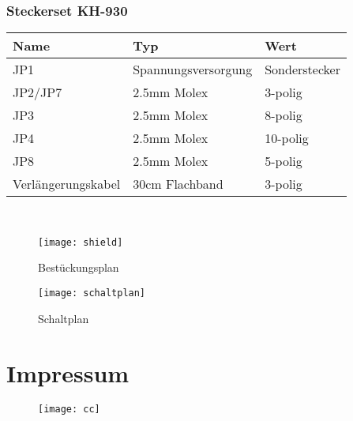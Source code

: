 \documentclass[fleqn,10pt]{SelfArx} %
\begin{document}
\subsubsection*{Steckerset KH-930}

\begin{tabular}{lll}
\hline
\textbf{Name}      & \textbf{Typ}        & \textbf{Wert}  \\ \hline
JP1                & Spannungsversorgung & Sonderstecker  \\ \hline
JP2/JP7            & 2.5mm Molex         & 3-polig        \\ \hline
JP3                & 2.5mm Molex         & 8-polig        \\ \hline
JP4                & 2.5mm Molex         & 10-polig       \\ \hline
JP8                & 2.5mm Molex         & 5-polig        \\ \hline
Verlängerungskabel & 30cm Flachband      & 3-polig        \\ \hline
\end{tabular}\\

 \begin{figure}[tbhp]\centering
 \texttt{[image: shield]}
 \caption{Bestückungsplan}
 \end{figure}

 \FloatBarrier

 \begin{figure*}[tbhp]\centering %
 \texttt{[image: schaltplan]}
 \caption{Schaltplan}
 \end{figure*}

\FloatBarrier

\section*{Impressum} %


\begin{figure}[tbhp]
\texttt{[image: cc]}
\end{figure}
\end{document}
